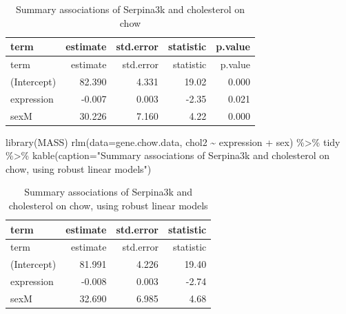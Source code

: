 \documentclass[
]{article}
\newenvironment{Shaded}{\begin{snugshade}}{\end{snugshade}}
\newcommand{\AttributeTok}[1]{\textcolor[rgb]{0.77,0.63,0.00}{#1}}
\newcommand{\FunctionTok}[1]{\textcolor[rgb]{0.00,0.00,0.00}{#1}}
\newcommand{\NormalTok}[1]{#1}
\newcommand{\SpecialCharTok}[1]{\textcolor[rgb]{0.00,0.00,0.00}{#1}}
\newcommand{\StringTok}[1]{\textcolor[rgb]{0.31,0.60,0.02}{#1}}
\begin{document}
\begin{longtable}[]{@{}lrrrr@{}}
\caption{Summary associations of Serpina3k and cholesterol on
chow}\tabularnewline
\toprule()
term & estimate & std.error & statistic & p.value \\
\midrule()
\endfirsthead
\toprule()
term & estimate & std.error & statistic & p.value \\
\midrule()
\endhead
(Intercept) & 82.390 & 4.331 & 19.02 & 0.000 \\
expression & -0.007 & 0.003 & -2.35 & 0.021 \\
sexM & 30.226 & 7.160 & 4.22 & 0.000 \\
\bottomrule()
\end{longtable}

\begin{Shaded}
\begin{Highlighting}[]
\FunctionTok{library}\NormalTok{(MASS)}
\FunctionTok{rlm}\NormalTok{(}\AttributeTok{data=}\NormalTok{gene.chow.data, chol2 }\SpecialCharTok{\textasciitilde{}}\NormalTok{ expression }\SpecialCharTok{+}\NormalTok{ sex) }\SpecialCharTok{\%\textgreater{}\%}
\NormalTok{  tidy }\SpecialCharTok{\%\textgreater{}\%}
  \FunctionTok{kable}\NormalTok{(}\AttributeTok{caption=}\StringTok{"Summary associations of Serpina3k and cholesterol on chow, using robust linear models"}\NormalTok{)}
\end{Highlighting}
\end{Shaded}

\begin{longtable}[]{@{}lrrr@{}}
\caption{Summary associations of Serpina3k and cholesterol on chow,
using robust linear models}\tabularnewline
\toprule()
term & estimate & std.error & statistic \\
\midrule()
\endfirsthead
\toprule()
term & estimate & std.error & statistic \\
\midrule()
\endhead
(Intercept) & 81.991 & 4.226 & 19.40 \\
expression & -0.008 & 0.003 & -2.74 \\
sexM & 32.690 & 6.985 & 4.68 \\
\bottomrule()
\end{longtable}
\end{document}
